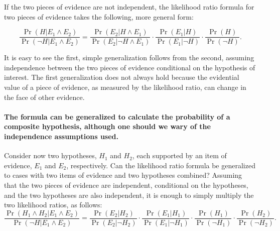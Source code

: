 \documentclass[10pt]{article}
\begin{document}
 If the two pieces of evidence are not independent, 
the likelihood ratio formula for two pieces of evidence 
takes the following, more general 
form:

	\[ \frac{\Pr(H|E_1 \land E_2)}{\Pr(\neg H | E_1 \land E_2)} = 
	\frac{\Pr(E_2 | H \land E_1)}{\Pr(E_2| \neg H \land E_1)}
	\cdot 
	\frac{\Pr(E_1 | H)}{\Pr(E_1| \neg H)}
	\cdot 
	\frac{\Pr(H)}{\Pr(\neg H)}.\]

\noindent It is easy to see the first, simple generalization follows from the second, assuming 
independence between the two pieces of evidence conditional on the hypothesis of interest. 
The first generalization does not always hold because 
the evidential value of a piece of evidence, as measured by the likelihood ratio, 
can change in the face of other evidence. 











\paragraph{The formula can be generalized to calculate the probability of a composite hypothesis, although one should we wary 
of the independence assumptions used.} 
Consider now two hypotheses, $H_1$ and $H_2$, each supported by an item of 
evidence, $E_1$ and $E_2$, respectively. Can the likelihood ratio formula be generalized to cases with 
two items of evidence and two hypotheses combined? Assuming that the two pieces of evidence are independent, conditional on the hypotheses, 
and the two hypotheses are also independent, 
it is enough to simply multiply the two likelihood ratios, as follows:
%
\[ \frac{\Pr(H_1\wedge H_2|E_1 \land E_2)}{\Pr(\neg H | E_1 \land E_2)} = 
	\frac{\Pr(E_2 | H_2)}{\Pr(E_2| \neg H_2)}
	\cdot 
	\frac{\Pr(E_1 | H_1)}{\Pr(E_1| \neg H_1)}
	\cdot 
	\frac{\Pr(H_1)}{\Pr(\neg H_1)}\cdot \frac{\Pr(H_2)}{\Pr(\neg H_2)}.\]
%
\end{document}
